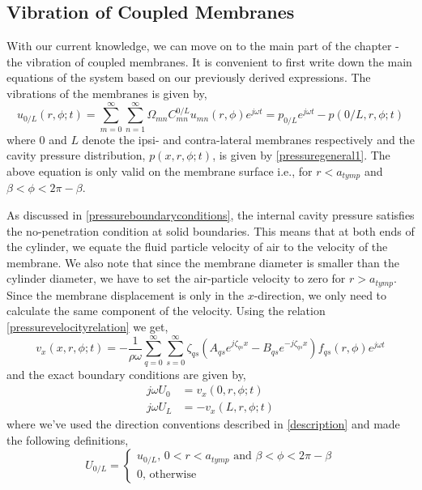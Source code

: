 \subsection{Vibration of Coupled Membranes}
With our current knowledge, we can move on to the main part of the chapter - the vibration of coupled membranes.
It is convenient to first write down the main equations of the system based on our previously derived expressions.
The vibrations of the membranes is given by,
\begin{equation}
 u_{0/L}(r,\phi;t)=\displaystyle\sum^{\infty}_{m=0}\sum^{\infty}_{n=1}\Omega_{mn}C^{0/L}_{mn}u_{mn}(r,\phi)e^{j\omega t}=p_{0/L}e^{j\omega t}-p(0/L,r,\phi;t)
\end{equation}
where $0$ and $L$ denote the ipsi- and contra-lateral membranes respectively and the cavity pressure distribution, $p(x,r,\phi;t)$,  is given by \eqref{pressuregeneral1}.
The above equation is only valid on the membrane surface i.e., for $r<a_{tymp}$ and $\beta<\phi<2\pi-\beta$.

As discussed in \ref{pressureboundaryconditions}, the internal cavity pressure satisfies the no-penetration condition at solid boundaries.
This means that at both ends of the cylinder, we equate the fluid particle velocity of air to the velocity of the membrane. We also note that
 since the membrane diameter is smaller than the cylinder diameter, we have to set the air-particle velocity to zero for $r>a_{tymp}$. Since the membrane displacement is
only in the $x$-direction, we only need to calculate the same component of the velocity. Using the relation \eqref{pressurevelocityrelation} we get,
\begin{equation}\label{airvelocity}
v_x(x,r,\phi;t)=-\frac{1}{\rho\omega}\displaystyle\sum^\infty_{q=0}\displaystyle\sum^\infty_{s=0}\zeta_{qs}\left(A_{qs}e^{j\zeta_{qs}x}-B_{qs}e^{-j\zeta_{qs}x}\right)f_{qs}(r,\phi)e^{j\omega t}
\end{equation}
and the exact boundary conditions are given by,
\begin{align}
 j\omega U_{0}&=v_x(0,r,\phi;t)\\
 j\omega U_{L}&=-v_x(L,r,\phi;t)
\end{align}
where we've used the direction conventions described in \ref{description} and made the following definitions,
\begin{equation}
 U_{0/L}=\begin{cases}
          u_{0/L}\mbox{, } 0<r<a_{tymp}\mbox{ and } \beta<\phi<2\pi-\beta\\
          0\mbox{, otherwise}
         \end{cases}
\end{equation}

